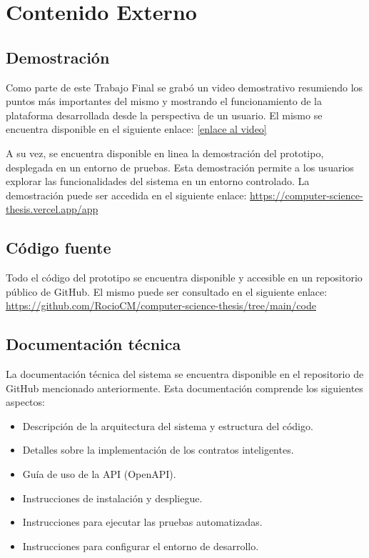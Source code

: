 \chapter{Contenido Externo}
\label{cp:annex-content}

\parindent0pt

\section{Demostración}

Como parte de este Trabajo Final se grabó un video demostrativo resumiendo los puntos más importantes del mismo y mostrando el funcionamiento de la plataforma desarrollada desde la perspectiva de un usuario. El mismo se encuentra disponible en el siguiente enlace: 
\href{enlace al video}{[enlace al video]} %

A su vez, se encuentra disponible en linea la demostración del prototipo, desplegada en un entorno de pruebas. Esta demostración permite a los usuarios explorar las funcionalidades del sistema en un entorno controlado. La demostración puede ser accedida en el siguiente enlace: \href{https://computer-science-thesis.vercel.app/app}{https://computer-science-thesis.vercel.app/app}

\section{Código fuente}

Todo el código del prototipo se encuentra disponible y accesible en un repositorio público de GitHub. El mismo puede ser consultado en el siguiente enlace: \href{https://github.com/RocioCM/computer-science-thesis/tree/main/code}{https://github.com/RocioCM/computer-science-thesis/tree/main/code}

\section{Documentación técnica}

La documentación técnica del sistema se encuentra disponible en el repositorio de GitHub mencionado anteriormente. Esta documentación comprende los siguientes aspectos:

\begin{itemize}
	\item Descripción de la arquitectura del sistema y estructura del código.
	\item Detalles sobre la implementación de los contratos inteligentes.
	\item Guía de uso de la API (OpenAPI).
	\item Instrucciones de instalación y despliegue.
	\item Instrucciones para ejecutar las pruebas automatizadas.
	\item Instrucciones para configurar el entorno de desarrollo.
\end{itemize}
